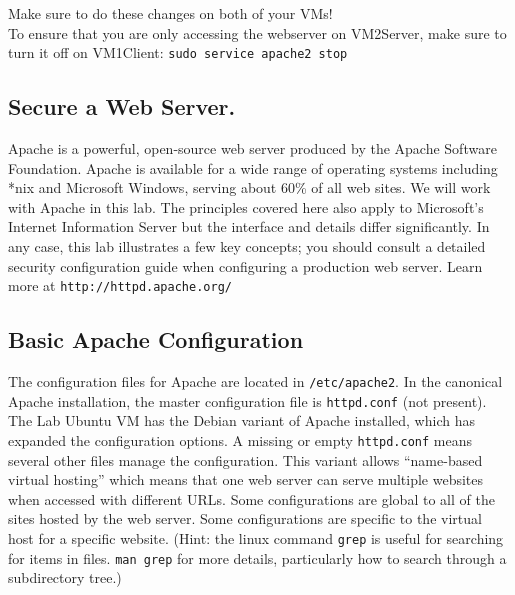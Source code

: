 \documentclass{article}
\begin{document}
Make sure to do these changes on both of your VMs!\\

To ensure that you are only accessing the webserver on VM2Server, make sure to turn it off on VM1Client: {\tt sudo service apache2 stop}

\subsection{Secure a Web Server.}


Apache is a powerful, open-source web server produced by the Apache Software Foundation. Apache is available for a wide range of operating systems including *nix and Microsoft Windows, serving about 60\% of all web sites. We will work with Apache in this lab. The principles covered here also apply to Microsoft's Internet Information Server but the interface and details differ significantly. In any case, this lab illustrates a few key concepts; you should consult a detailed security configuration guide when configuring a production web server.  Learn more at {\tt http://httpd.apache.org/}
	
\subsection{Basic Apache Configuration}

The configuration files for Apache are located in {\tt /etc/apache2}.  In the canonical Apache installation, the master configuration file is {\tt httpd.conf} (not present).  The Lab Ubuntu VM has the Debian variant of Apache installed, which has expanded the configuration options.  A missing or empty {\tt httpd.conf} means several other files manage the configuration.  This variant allows ``name-based virtual hosting'' which means that one web server can serve multiple websites when accessed with different URLs.  Some configurations are global to all of the sites hosted by the web server.  Some configurations are specific to the virtual host for a specific website.  (Hint: the linux command {\tt grep} is useful for searching for items in files.  {\tt man grep} for more details, particularly how to search through a subdirectory tree.)
\end{document}
